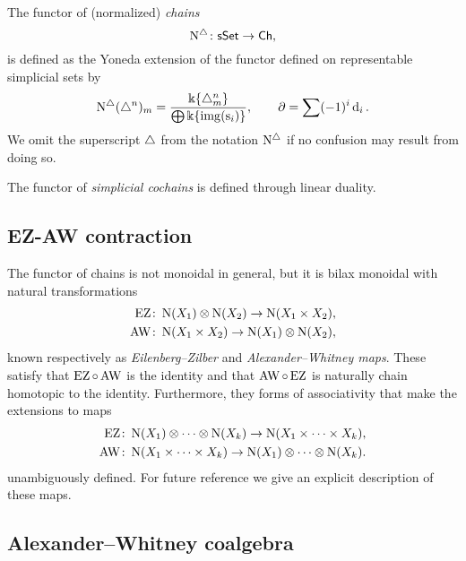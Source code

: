 The functor of (normalized) \textit{chains}
\[
\operatorname{N^{\triangle}} \colon \mathsf{sSet} \to \mathsf{Ch},
\]
is defined as the Yoneda extension of the functor defined on representable simplicial sets by
\[
\operatorname{N^{\triangle}}(\triangle^n)_m =
\frac{\Bbbk\{\triangle^n_m\}}{\bigoplus \Bbbk\{\mathrm{img}(\operatorname{s}_i)\}},
\qquad
\operatorname{\partial} = \sum (-1)^i \operatorname{d}_i.
\]
We omit the superscript $\triangle$ from the notation $\operatorname{N^{\triangle}}$ if no confusion may result from doing so.

The functor of \textit{simplicial cochains} is defined through linear duality.

\subsection{EZ-AW contraction}

The functor of chains is not monoidal in general, but
it is bilax monoidal with natural transformations
\[
\begin{split}
\operatorname{EZ} & \colon \operatorname{N}(X_1) \otimes \operatorname{N}(X_2) \to \operatorname{N}(X_1 \times X_2), \\
\operatorname{AW} & \colon \operatorname{N}(X_1 \times X_2) \to \operatorname{N}(X_1) \otimes \operatorname{N}(X_2),
\end{split}
\]
known respectively as \textit{Eilenberg--Zilber} and \textit{Alexander--Whitney maps}.
These satisfy that $\operatorname{EZ} \circ \operatorname{AW}$ is the identity and that $\operatorname{AW} \circ \operatorname{EZ}$ is naturally chain homotopic to the identity.
Furthermore, they forms of associativity that make the extensions to maps
\[
\begin{split}
\operatorname{EZ} & \colon \operatorname{N}(X_1) \otimes \dotsb \otimes \operatorname{N}(X_k) \to \operatorname{N}(X_1 \times \dotsb \times X_k), \\
\operatorname{AW} & \colon \operatorname{N}(X_1 \times \dotsb \times X_k) \to \operatorname{N}(X_1) \otimes \dotsb \otimes \operatorname{N}(X_k).
\end{split}
\]
unambiguously defined.
For future reference we give an explicit description of these maps.


\subsection{Alexander--Whitney coalgebra}

